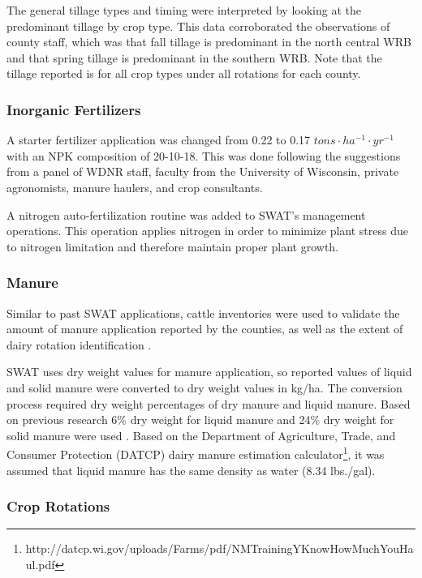 The general tillage types and timing were interpreted by looking at the predominant tillage by
crop type. This data corroborated the observations of county staff, which was that
fall tillage is predominant in the north central WRB and that spring tillage is predominant in the
southern WRB. Note that the tillage reported is for all crop types under all rotations for each county.

\subsubsection{Inorganic Fertilizers}

A starter fertilizer application was changed from 0.22 to 0.17 $tons \cdot ha^{-1} \cdot yr^{-1}$ with an NPK composition of 20-10-18. This was done following the suggestions from a panel of WDNR staff, faculty from the University of Wisconsin, private agronomists, manure haulers, and crop consultants.

A nitrogen auto-fertilization routine was added to SWAT's management operations. 
This operation applies nitrogen in order to minimize plant stress due to nitrogen limitation and therefore maintain proper plant growth.

\subsubsection{Manure}

Similar to past SWAT applications, cattle inventories were used to validate the amount of manure application reported by the counties, as well as the extent of dairy rotation identification \citep{baumgart_source_2005, freihoefer_mead_2007, timm_swat_2011}.

SWAT uses dry weight values for manure application, so reported values of liquid and solid manure were converted to dry weight values in kg/ha. The conversion process required dry weight percentages of dry manure and liquid manure. Based on previous research 6\% dry weight for liquid manure and 24\% dry weight for solid manure were used . Based on the Department of Agriculture, Trade, and Consumer Protection (DATCP) dairy manure estimation calculator\footnote{http://datcp.wi.gov/uploads/Farms/pdf/NMTrainingYKnowHowMuchYouHaul.pdf}, it was assumed that liquid manure has the same density as water (8.34 lbs./gal).

\subsubsection{Crop Rotations}

